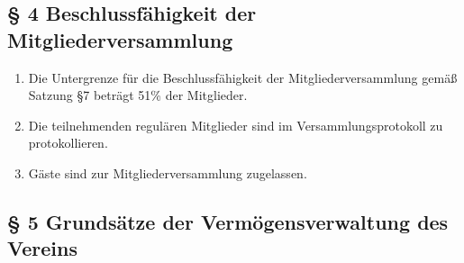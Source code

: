 \documentclass[10pt,a4paper]{article}
\begin{document}
\subsection*{§ 4 Beschlussfähigkeit der Mitgliederversammlung}
\begin{enumerate}
\item Die Untergrenze für die Beschlussfähigkeit der Mitgliederversammlung
    gemäß Satzung §7 beträgt 51\% der Mitglieder.
\item Die teilnehmenden regulären Mitglieder sind im Versammlungsprotokoll zu protokollieren.
\item Gäste sind zur Mitgliederversammlung zugelassen.

\end{enumerate}
%
%
\subsection*{§ 5 Grundsätze der Vermögensverwaltung des Vereins}
\end{document}
